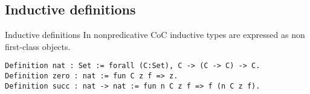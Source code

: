 \documentclass{beamer}
\begin{document}
\subsection{Inductive definitions}
\begin{frame}[fragile]{Inductive definitions}
In nonpredicative CoC inductive types are expressed as non first-class objects.

\begin{lstlisting}
Definition nat : Set := forall (C:Set), C -> (C -> C) -> C.
Definition zero : nat := fun C z f => z.
Definition succ : nat -> nat := fun n C z f => f (n C z f).
\end{lstlisting}

\end{frame}

\end{document}
